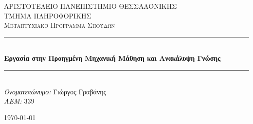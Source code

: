 \documentclass[a4paper,12pt]{article}
\begin{document}
	
	\begin{titlepage}
		
		\newcommand{\HRule}{\rule{\linewidth}{0.5mm}} %
		
		\center %
		
		
		\textsc{\LARGE ΑΡΙΣΤΟΤΕΛΕΙΟ ΠΑΝΕΠΙΣΤΗΜΙΟ ΘΕΣΣΑΛΟΝΙΚΗΣ}\\[1.5cm] %
		\textsc{\Large ΤΜΗΜΑ ΠΛΗΡΟΦΟΡΙΚΗΣ}\\[0.5cm] %
		\textsc{\large Μεταπτυχιακό Πρόγραμμα Σπουδών}\\[0.5cm] %
		

		\HRule \\[0.4cm]
		{ \huge \bfseries Εργασία στην Προηγμένη Μηχανική Μάθηση και Ανακάλυψη Γνώσης}\\[0.4cm] %
		\HRule \\[1.5cm]
		
		
	
		\Large \emph{Ονοματεπώνυμο: } Γιώργος Γραβάνης\\
		\emph{ΑΕΜ: } 339
		
		
		{\large \today}\\[2cm] %
		
		

\end{titlepage}
\end{document}
